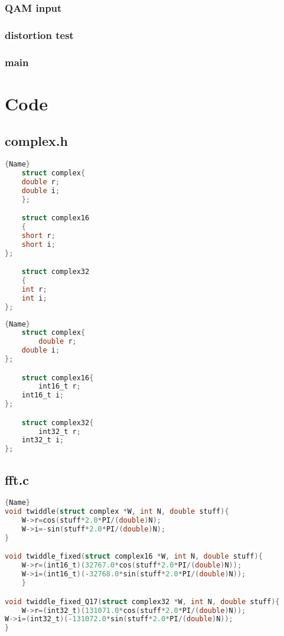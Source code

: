 \documentclass[a4paper]{article}
\begin{document}
\subsubsection{QAM input}
\subsubsection{distortion test}
\subsubsection{main}

\section{Code}
\subsection{complex.h}
\noindent\begin{minipage}{.45\textwidth}
    \begin{lstlisting}[caption=code 1 1,frame=tlrb, language=C]{Name}
    struct complex{
    double r;
    double i;
    };

    struct complex16
    {
    short r;
    short i;
};

    struct complex32
    {
    int r;
    int i;
};
    \end{lstlisting}
\end{minipage}\hfill
\begin{minipage}{.45\textwidth}
    \begin{lstlisting}[caption=code 2,frame=tlrb, language=C]{Name}
    struct complex{
        double r;
    double i;
};

    struct complex16{
        int16_t r;
    int16_t i;
};

    struct complex32{
        int32_t r;
    int32_t i;
};
    \end{lstlisting}
\end{minipage}




\subsection{fft.c}
\begin{lstlisting}[caption=code 3,frame=tlrb, language=C]{Name}
void twiddle(struct complex *W, int N, double stuff){
    W->r=cos(stuff*2.0*PI/(double)N);
    W->i=-sin(stuff*2.0*PI/(double)N);
}

void twiddle_fixed(struct complex16 *W, int N, double stuff){
    W->r=(int16_t)(32767.0*cos(stuff*2.0*PI/(double)N));
    W->i=(int16_t)(-32768.0*sin(stuff*2.0*PI/(double)N));
    }

void twiddle_fixed_Q17(struct complex32 *W, int N, double stuff){
    W->r=(int32_t)(131071.0*cos(stuff*2.0*PI/(double)N));
W->i=(int32_t)(-131072.0*sin(stuff*2.0*PI/(double)N));
}
\end{lstlisting}
\end{document}
